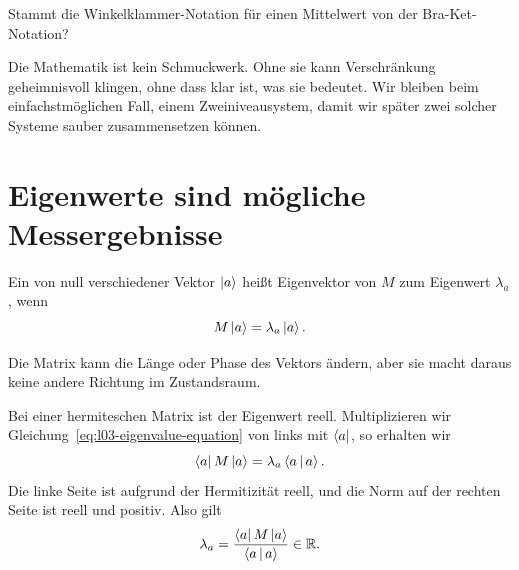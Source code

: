 \begin{classroomqa}
Stammt die Winkelklammer-Notation für einen Mittelwert von der Bra-Ket-Notation?
\end{classroomqa}

\begin{classroomqa}
\end{classroomqa}

Die Mathematik ist kein Schmuckwerk. Ohne sie kann Verschränkung geheimnisvoll klingen, ohne dass klar ist, was sie bedeutet. Wir bleiben beim einfachstmöglichen Fall, einem Zweiniveausystem, damit wir später zwei solcher Systeme sauber zusammensetzen können.

\section{Eigenwerte sind mögliche Messergebnisse}

\begin{definition}
Ein von null verschiedener Vektor \(\left\lvert a\right\rangle\) heißt Eigenvektor von \(M\) zum Eigenwert \(\lambda_a\), wenn
\begin{equation}
  M\left\lvert a\right\rangle=\lambda_a\left\lvert a\right\rangle.
  \label{eq:l03-eigenvalue-equation}
\end{equation}
\end{definition}
Die Matrix kann die Länge oder Phase des Vektors ändern, aber sie macht daraus keine andere Richtung im Zustandsraum.

Bei einer hermiteschen Matrix ist der Eigenwert reell. Multiplizieren wir Gleichung~\eqref{eq:l03-eigenvalue-equation} von links mit \(\left\langle a\right\rvert\), so erhalten wir
\begin{equation}
  \left\langle a\right\rvert M\left\lvert a\right\rangle
  =\lambda_a\left\langle a\,\middle|\,a\right\rangle.
\end{equation}
Die linke Seite ist aufgrund der Hermitizität reell, und die Norm auf der rechten Seite ist reell und positiv. Also gilt
\begin{equation}
  \lambda_a
  =
  \frac{\left\langle a\right\rvert M\left\lvert a\right\rangle}{\left\langle a\,\middle|\,a\right\rangle}
  \in\mathbb R.
  \label{eq:l03-real-eigenvalue}
\end{equation}


